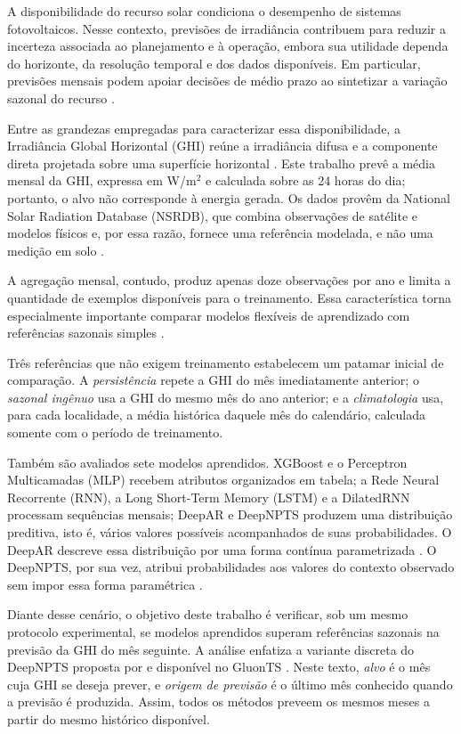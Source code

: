 \documentclass[12pt,a4paper,fleqn]{article}
\begin{document}
A disponibilidade do recurso solar condiciona o desempenho de sistemas fotovoltaicos. Nesse contexto, previsões de irradiância contribuem para reduzir a incerteza associada ao planejamento e à operação, embora sua utilidade dependa do horizonte, da resolução temporal e dos dados disponíveis. Em particular, previsões mensais podem apoiar decisões de médio prazo ao sintetizar a variação sazonal do recurso \citep{antonanzas2016,voyant2017}.

Entre as grandezas empregadas para caracterizar essa disponibilidade, a Irradiância Global Horizontal (GHI) reúne a irradiância difusa e a componente direta projetada sobre uma superfície horizontal \citep{duffie2013}. Este trabalho prevê a média mensal da GHI, expressa em W/m$^2$ e calculada sobre as 24 horas do dia; portanto, o alvo não corresponde à energia gerada. Os dados provêm da National Solar Radiation Database (NSRDB), que combina observações de satélite e modelos físicos e, por essa razão, fornece uma referência modelada, e não uma medição em solo \citep{sengupta2018}.

A agregação mensal, contudo, produz apenas doze observações por ano e limita a quantidade de exemplos disponíveis para o treinamento. Essa característica torna especialmente importante comparar modelos flexíveis de aprendizado com referências sazonais simples \citep{voyant2017,voyant2022}.

Três referências que não exigem treinamento estabelecem um patamar inicial de comparação. A \textit{persistência} repete a GHI do mês imediatamente anterior; o \textit{sazonal ingênuo} usa a GHI do mesmo mês do ano anterior; e a \textit{climatologia} usa, para cada localidade, a média histórica daquele mês do calendário, calculada somente com o período de treinamento.

Também são avaliados sete modelos aprendidos. XGBoost e o Perceptron Multicamadas (MLP) recebem atributos organizados em tabela; a Rede Neural Recorrente (RNN), a Long Short-Term Memory (LSTM) e a DilatedRNN processam sequências mensais; DeepAR e DeepNPTS produzem uma distribuição preditiva, isto é, vários valores possíveis acompanhados de suas probabilidades. O DeepAR descreve essa distribuição por uma forma contínua parametrizada \citep{salinas2020}. O DeepNPTS, por sua vez, atribui probabilidades aos valores do contexto observado sem impor essa forma paramétrica \citep{rangapuram2023}.

Diante desse cenário, o objetivo deste trabalho é verificar, sob um mesmo protocolo experimental, se modelos aprendidos superam referências sazonais na previsão da GHI do mês seguinte. A análise enfatiza a variante discreta do DeepNPTS proposta por \citet{rangapuram2023} e disponível no GluonTS \citep{alexandrov2020}. Neste texto, \textit{alvo} é o mês cuja GHI se deseja prever, e \textit{origem de previsão} é o último mês conhecido quando a previsão é produzida. Assim, todos os métodos preveem os mesmos meses a partir do mesmo histórico disponível.
\end{document}
